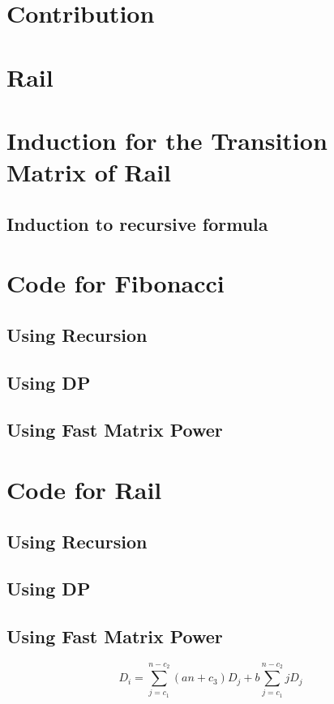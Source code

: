 \section{Contribution}

\section{Rail}
\label{rail}


\section{Induction for the Transition Matrix of Rail}
\label{induction for Rail}

\subsection{Induction to recursive formula} 

\section{Code for Fibonacci}
\label{Fibonacci Code}
\subsection{Using Recursion}


\subsection{Using DP}


\subsection{Using Fast Matrix Power}


\section{Code for Rail}
\label{Rail Code}
\subsection{Using Recursion}

\subsection{Using DP}

\subsection{Using Fast Matrix Power}




\begin{equation}
    D_i = \sum\limits_{j = c_1}^{n - c_2}(an + c_3)D_j + b \sum\limits_{j = c_1}^{n - c_2} j D_j
\end{equation}